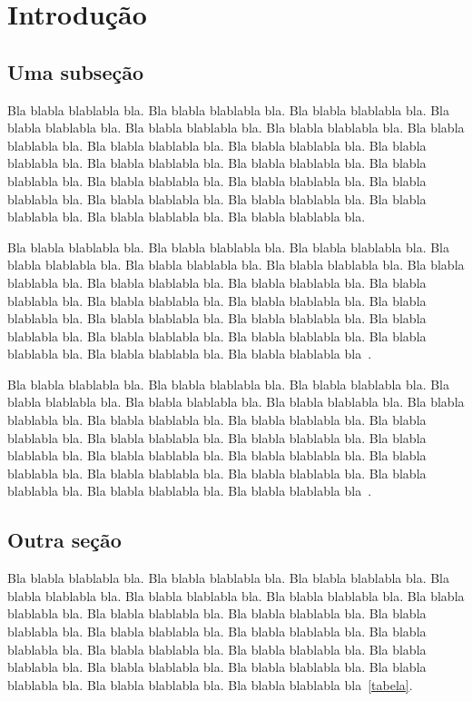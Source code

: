 \documentclass[tese,capa]{texufpel}
\begin{document}
\tableofcontents

\chapter{Introdução}

\section{Uma subseção}
Bla blabla blablabla bla.  Bla blabla blablabla bla.  Bla blabla
blablabla bla.  Bla blabla blablabla bla.  Bla blabla blablabla bla.
Bla blabla blablabla bla.  Bla blabla blablabla bla.  Bla blabla
blablabla bla.  Bla blabla blablabla bla.  Bla blabla blablabla bla.
Bla blabla blablabla bla.  Bla blabla blablabla bla.  Bla blabla
blablabla bla.  Bla blabla blablabla bla.  Bla blabla blablabla bla.
Bla blabla blablabla bla.  Bla blabla blablabla bla.  Bla blabla
blablabla bla.  Bla blabla blablabla bla.  Bla blabla blablabla bla.
Bla blabla blablabla bla.

Bla blabla blablabla bla.  Bla blabla blablabla bla.  Bla blabla
blablabla bla.  Bla blabla blablabla bla.  Bla blabla blablabla bla.
Bla blabla blablabla bla.  Bla blabla blablabla bla.  Bla blabla
blablabla bla.  Bla blabla blablabla bla.  Bla blabla blablabla bla.
Bla blabla blablabla bla.  Bla blabla blablabla bla.  Bla blabla
blablabla bla.  Bla blabla blablabla bla.  Bla blabla blablabla bla.
Bla blabla blablabla bla.  Bla blabla blablabla bla.  Bla blabla
blablabla bla.  Bla blabla blablabla bla.  Bla blabla blablabla bla.
Bla blabla blablabla bla~\citet{Moore:1979:MAI,Aguiar:2005}.

Bla blabla blablabla bla.  Bla blabla blablabla bla.  Bla blabla
blablabla bla.  Bla blabla blablabla bla.  Bla blabla blablabla bla.
Bla blabla blablabla bla.  Bla blabla blablabla bla.  Bla blabla
blablabla bla.  Bla blabla blablabla bla.  Bla blabla blablabla bla.
Bla blabla blablabla bla.  Bla blabla blablabla bla.  Bla blabla
blablabla bla.  Bla blabla blablabla bla.  Bla blabla blablabla bla.
Bla blabla blablabla bla.  Bla blabla blablabla bla.  Bla blabla
blablabla bla.  Bla blabla blablabla bla.  Bla blabla blablabla bla.
Bla blabla blablabla bla~\cite{vonNeumann:1966:TSR}.

\section{Outra seção}

Bla blabla blablabla bla.  Bla blabla blablabla bla.  Bla blabla
blablabla bla.  Bla blabla blablabla bla.  Bla blabla blablabla bla.
Bla blabla blablabla bla.  Bla blabla blablabla bla.  Bla blabla
blablabla bla.  Bla blabla blablabla bla.  Bla blabla blablabla bla.
Bla blabla blablabla bla.  Bla blabla blablabla bla.  Bla blabla
blablabla bla.  Bla blabla blablabla bla.  Bla blabla blablabla bla.
Bla blabla blablabla bla.  Bla blabla blablabla bla.  Bla blabla
blablabla bla.  Bla blabla blablabla bla.  Bla blabla blablabla bla.
Bla blabla blablabla bla~\ref{tabela}.
\end{document}
